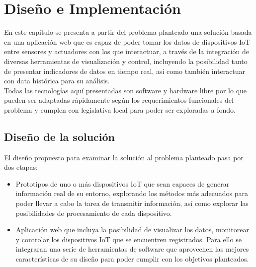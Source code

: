 

\chapter{Diseño e Implementación}
En este capitulo se presenta a partir del problema planteado una solución basada en una aplicación web que es capaz de poder tomar los datos de dispositivos IoT entre sensores y actuadores con los que interactuar, a través de la integración de diversas herramientas de visualización y control, incluyendo la posibilidad tanto de presentar indicadores de datos en tiempo real, así como también interactuar con data histórica para su análisis.\\

Todas las tecnologías aquí presentadas son software y hardware libre por lo que pueden ser adaptadas rápidamente según los requerimientos funcionales del problema y cumplen con legislativa local para poder ser exploradas a fondo. 

\section{Diseño de la solución}
El diseño propuesto para examinar la solución al problema planteado pasa por dos etapas:
\begin{itemize}
\item Prototipos de uno o más dispositivos IoT que sean capaces de generar información real de su entorno, explorando los métodos más adecuados para poder llevar a cabo la tarea de transmitir información, así como explorar las posibilidades de procesamiento de cada dispositivo.
\item Aplicación web que incluya la posibilidad de visualizar los datos, monitorear y controlar los dispositivos IoT que se encuentren registrados. Para ello se integraran una serie de herramientas de software que aprovechen las mejores características de su diseño para poder cumplir con los objetivos planteados.
\end{itemize}

